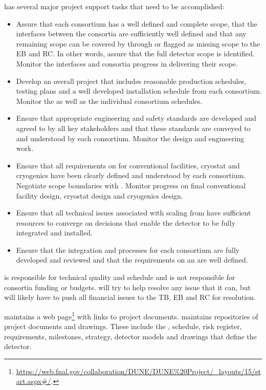  has several major project support tasks that need to be accomplished:
\begin{itemize}
  \item Assure that each consortium has a well defined and complete
    scope, that the interfaces between the consortia are sufficiently
    well defined and that any remaining scope can be covered by 
    through  or flagged as missing scope to the EB and RC. In
    other words, assure that the full detector scope is
    identified. Monitor the interfaces and consortia progress in
    delivering their scope.
  \item Develop an overall project 
    that includes reasonable production schedules, testing plans and a
    well developed installation schedule from each consortium. Monitor
    the  as well as the individual consortium schedules.
  \item Ensure that appropriate engineering and safety standards are
    developed and agreed to by all key stakeholders and that these
    standards are conveyed to and understood by each
    consortium. Monitor the design and engineering work.
  \item Ensure that all  requirements on  for
    conventional facilities, cryostat and cryogenics have been clearly
    defined and understood by each consortium. Negotiate scope
    boundaries with . Monitor  progress on
    final conventional facility design, cryostat design and cryogenics
    design.
  \item Ensure that all technical issues associated with scaling from
     have sufficient resources to converge on
    decisions that enable the detector to be fully integrated and
    installed.
  \item Ensure that the integration and  processes for each
    consortium are fully developed and reviewed and that the
    requirements on an  are well defined.
\end{itemize}

 is responsible for technical quality and schedule and is not
responsible for consortia funding or budgets.   will try to help
resolve any issue that it can, but will likely have to push all
financial issues to the TB, EB and RC for resolution.

 maintains a web page\footnote{\url{https://web.fnal.gov/collaboration/DUNE/DUNE\%20Project/\_layouts/15/start.aspx\#/}.}
with links to project documents.  maintains repositories of project
documents and drawings. These include the , schedule, risk
register, requirements, milestones, strategy, detector models and
drawings that define the  detector.


